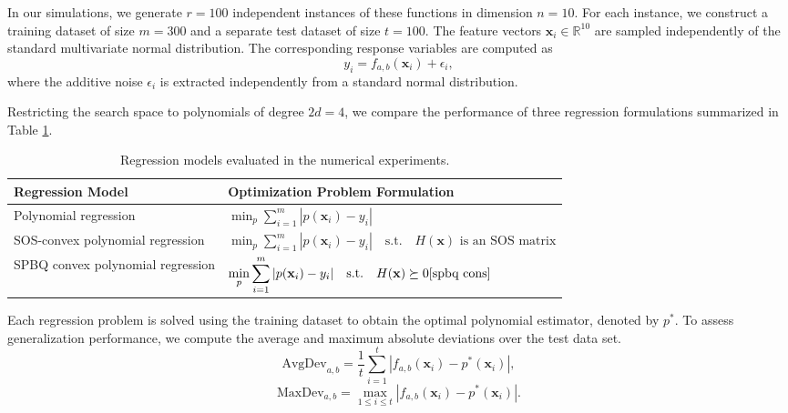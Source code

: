 \documentclass[12pt]{elsarticle}
\theoremstyle{definition}
\begin{document}
In our simulations, we generate $r = 100$ independent instances of these functions in dimension $n = 10$. For each instance, we construct a training dataset of size $m = 300$ and a separate test dataset of size $t = 100$. The feature vectors $\mathbf{x}_i \in \mathbb{R}^{10}$ are sampled independently of the standard multivariate normal distribution. The corresponding response variables are computed as 
\begin{equation}
y_i = f_{a,b}(\mathbf{x}_i) + \epsilon_i,
\end{equation}
where the additive noise $\epsilon_i$ is extracted independently from a standard normal distribution.

Restricting the search space to polynomials of degree $2d = 4$, we compare the performance of three regression formulations summarized in Table \ref{tab:reg_models}.

\begin{table}[h]
\centering
\begin{tabular}{|p{4cm}|p{9cm}|}
\hline
\textbf{Regression Model} & \textbf{Optimization Problem Formulation} \\
\hline

Polynomial regression &
$\displaystyle \min_{p} \sum_{i=1}^{m} |p(\mathbf{x}_i) - y_i|$ \\
\hline

SOS-convex polynomial regression &
$\displaystyle 
\min_{p} \sum_{i=1}^{m} |p(\mathbf{x}_i) - y_i|
\quad \text{s.t.} \quad
H(\mathbf{x}) \text{ is an SOS matrix}
$ \\
\hline

SPBQ convex polynomial regression &
$\displaystyle
\min_{p } \sum_{i=1}^{m} |p(\mathbf{x}_i) - y_i|
\quad \text{s.t.} \quad
H(\mathbf{x}) \succeq 0\eqref{spbq cons}
$ \\
\hline
\end{tabular}
\caption{Regression models evaluated in the numerical experiments.}
\label{tab:reg_models}
\end{table}

Each regression problem is solved using the training dataset to obtain the optimal polynomial estimator, denoted by $p^*$. To assess generalization performance, we compute the average and maximum absolute deviations over the test data set.
\begin{equation}
\text{AvgDev}_{a,b}
= \frac{1}{t} \sum_{i=1}^{t}
\left| f_{a,b}(\mathbf{x}_i) - p^*(\mathbf{x}_i) \right|,
\end{equation}
\begin{equation}
\text{MaxDev}_{a,b}
= \max_{1 \le i \le t}
\left| f_{a,b}(\mathbf{x}_i) - p^*(\mathbf{x}_i) \right|.
\end{equation}
\end{document}
